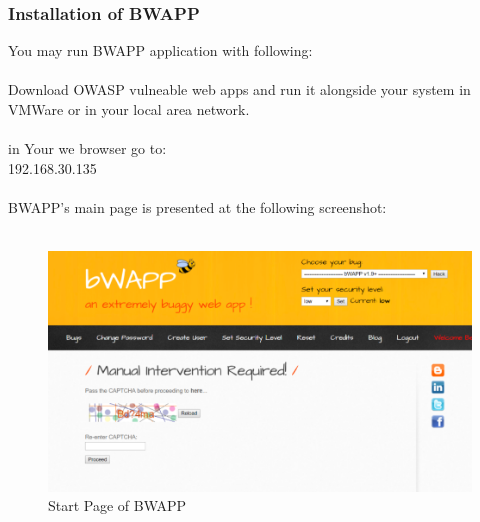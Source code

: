 \documentclass[12pt, a4paper]{article}
\begin{document}
\subsubsection{Installation of BWAPP}
You may run BWAPP application with following:\\
\\
Download OWASP vulneable web apps and run it alongside your system in VMWare or in your local area network.\\
\\
in Your we browser go to:\\
192.168.30.135\\
\\
BWAPP's main page is presented at the following screenshot:\\
\\
\begin{figure}[H]
\includegraphics[width=1.0\textwidth]{bwappStartPage.png}
\caption{Start Page of BWAPP}
\end{figure}
\end{document}
